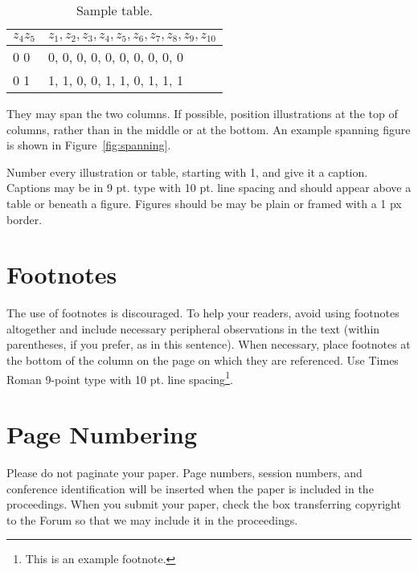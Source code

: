\documentclass[letterpaper,10pt,twocolumn]{article} %
\begin{document}
            
            \begin{table}[ht]
            	\caption{Sample table.}
                \label{tab:sample}
                \center
                \begin{tabular}{|l|l|}
                  \hline
                  $z_4 z_5$ & $z_1,z_2,z_3,z_4,z_5,z_6,z_7,z_8,z_9,z_{10}$ \\ \hline
                  0 0     & 0, 0, 0, 0, 0, 0, 0, 0, 0, 0                        \\ \hline
                  0 1     & 1, 1, 0, 0, 1, 1, 0, 1, 1, 1                        \\ \hline
                \end{tabular}
            \end{table}

They may span the two columns. 
If possible, position illustrations at the top of columns, rather than in the middle or at the bottom. 
An example spanning figure is shown in Figure~\ref{fig:spanning}. 

        
Number every illustration or table, starting with 1, and give it a caption. 
Captions may be in 9 pt. type with 10 pt. line spacing and should appear above a table or beneath a figure. 
Figures should be may be plain or framed with a 1 px border. 


\section{Footnotes}

The use of footnotes is discouraged. 
To help your readers, avoid using footnotes altogether and include necessary peripheral observations in the text (within parentheses, if you prefer, as in this sentence). 
When necessary, place footnotes at the bottom of the column on the page on which they are referenced. 
Use Times Roman 9-point type with 10 pt. line spacing\footnote{This is an example footnote.}. 


\section{Page Numbering}

Please do not paginate your paper. 
Page numbers, session numbers, and conference identification will be inserted when the paper is included in the proceedings. 
When you submit your paper, check the box transferring copyright to the Forum so that we may include it in the proceedings.
\end{document}
